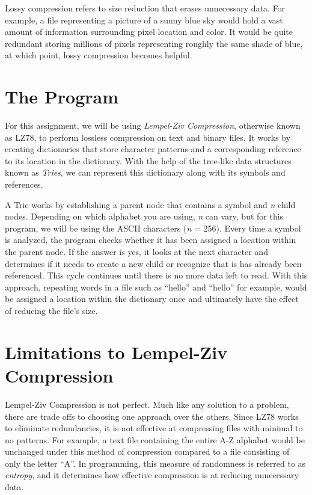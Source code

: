 \documentclass[12pt]{article}
\begin{document}
\vspace{0.2in}

Lossy compression refers to size reduction that erases unnecessary data. For example, a file representing a picture of a sunny blue sky would hold a vast amount of information surrounding pixel location and color. It would be quite redundant storing millions of pixels representing roughly the same shade of blue, at which point, lossy compression becomes helpful.

\section{The Program}

For this assignment, we will be using \textit{Lempel-Ziv Compression}, otherwise known as LZ78, to perform lossless compression on text and binary files. It works by creating dictionaries that store character patterns and a corresponding reference to its location in the dictionary. With the help of the tree-like data structures known as \textit{Tries}, we can represent this dictionary along with its symbols and references.

\vspace{0.2in}

A Trie works by establishing a parent node that contains a symbol and \textit{n} child nodes. Depending on which alphabet you are using, \textit{n} can vary, but for this program, we will be using the ASCII characters (\textit{n} = 256). Every time a symbol is analyzed, the program checks whether it has been assigned a location within the parent node. If the answer is yes, it looks at the next character and determines if it needs to create a new child or recognize that is has already been referenced. This cycle continues until there is no more data left to read. With this approach, repeating words in a file such as \enquote{hello} and \enquote{hello} for example, would be assigned a location within the dictionary once and ultimately have the effect of reducing the file's size.

\section{Limitations to Lempel-Ziv Compression}

Lempel-Ziv Compression is not perfect. Much like any solution to a problem, there are trade offs to choosing one approach over the others. Since LZ78 works to eliminate redundancies, it is not effective at compressing files with minimal to no patterns. For example, a text file containing the entire A-Z alphabet would be unchanged under this method of compression compared to a file consisting of only the letter \enquote{A}. In programming, this measure of randomness is referred to as \textit{entropy}, and it determines how effective compression is at reducing unnecessary data.
\end{document}
